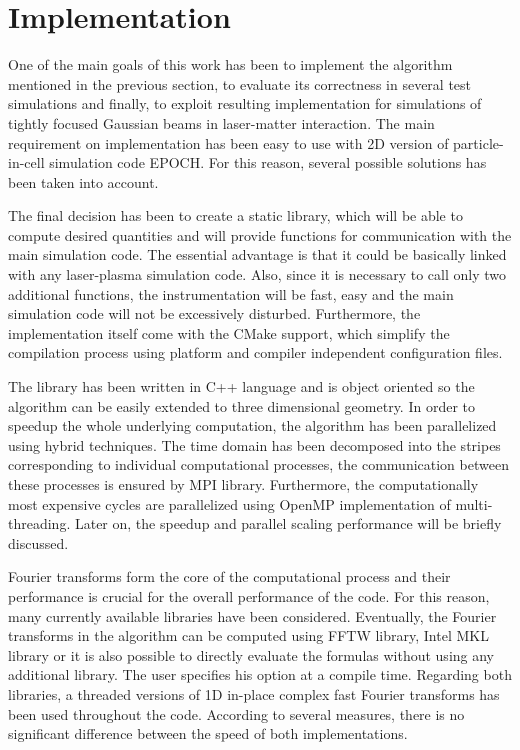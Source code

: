 \section{Implementation}

One of the main goals of this work has been to implement the algorithm mentioned in the previous section, to evaluate its correctness in several test simulations and finally, to exploit resulting implementation for simulations of tightly focused Gaussian beams in laser-matter interaction. The main requirement on implementation has been easy to use with 2D version of particle-in-cell simulation code EPOCH. For this reason, several possible solutions has been taken into account.

The final decision has been to create a static library, which will be able to compute desired quantities and will provide functions for communication with the main simulation code. The essential advantage is that it could be basically linked with any laser-plasma simulation code. Also, since it is necessary to call only two additional functions, the instrumentation will be fast, easy and the main simulation code will not be excessively disturbed. Furthermore, the implementation itself come with the CMake support, which simplify the compilation process using platform and compiler independent configuration files.

The library has been written in C++ language and is object oriented so the algorithm can be easily extended to three dimensional geometry. In order to speedup the whole underlying computation, the algorithm has been parallelized using hybrid techniques. The time domain has been decomposed into the stripes corresponding to individual computational processes, the communication between these processes is ensured by MPI library. Furthermore, the computationally most expensive cycles are parallelized using OpenMP implementation of multi-threading. Later on, the speedup and parallel scaling performance will be briefly discussed.

Fourier transforms form the core of the computational process and their performance is crucial for the overall performance of the code. For this reason, many currently available libraries have been considered. Eventually, the Fourier transforms in the algorithm can be computed using FFTW library, Intel MKL library or it is also possible to directly evaluate the formulas without using any additional library. The user specifies his option at a compile time. Regarding both libraries, a threaded versions of 1D in-place complex fast Fourier transforms has been used throughout the code. According to several measures, there is no significant difference between the speed of both implementations.

